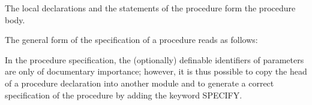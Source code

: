 The local declarations and the statements of the procedure form the
procedure body.
















The general form of the specification of a procedure reads as follows:





In the procedure specification, the (optionally) definable identifiers of
parameters are only of documentary importance; however, it is thus
possible to copy the head of a procedure declaration into another module
and to generate a correct specification of the procedure by adding the
keyword SPECIFY.

